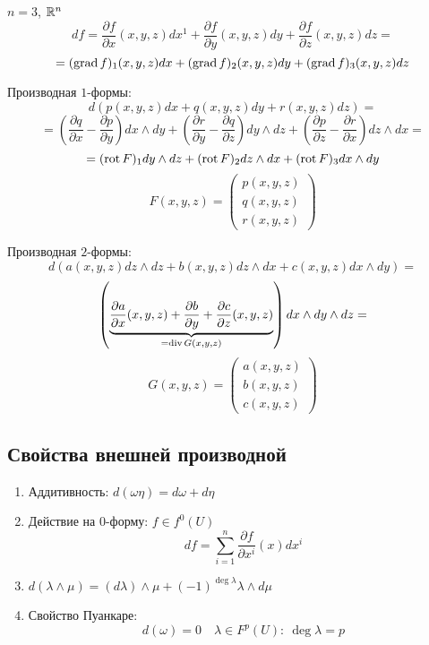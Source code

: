     \begin{illustration*}
        $n = 3$, $\mathbb{R}^n$
        \[
            df = \frac{\partial f}{\partial x}(x, y, z) dx^1 + \frac{\partial f}{\partial y}(x, y, z)dy + \frac{\partial f}{\partial z}(x, y, z)dz =    
        \]
        \[ 
            = (\operatorname{grad} f)_1(x, y, z)dx + (\operatorname{grad} f)_2(x, y, z)dy + (\operatorname{grad} f)_3(x, y, z) dz
        \]
        \par Производная $1$-формы:
        \[
            d(p(x, y, z)dx + q(x, y, z) dy + r(x, y, z) dz) = 
        \]
        \[
            = (\frac{\partial q}{\partial x} - \frac{\partial p}{\partial y})dx \wedge dy + (\frac{\partial r}{\partial y} - \frac{\partial q}{\partial z})dy\wedge dz + (\frac{\partial p}{\partial z} - \frac{\partial r}{\partial x})dz \wedge dx =  
        \]
        \[
            = (\operatorname{rot} F)_1 dy \wedge dz + (\operatorname{rot} F)_2 dz \wedge dx + (\operatorname{rot} F)_3 dx \wedge dy
        \]
        \[
            F(x, y, z) = \begin{pmatrix}
                p(x, y, z) \\
                q(x, y, z) \\
                r(x, y, z)
            \end{pmatrix}  
        \]
        \par Производная $2$-формы:
        \[
            d(a(x, y, z) dz \wedge dz + b(x, y, z) dz \wedge dx + c(x, y, z) dx \wedge dy) =    
        \]
        \[
            \left(\underbrace{\frac{\partial a}{\partial x}(x, y, z) + \frac{\partial b}{\partial y} + \frac{\partial c}{\partial z}(x, y, z)}_{= \operatorname{div} G(x, y, z)}\right) dx \wedge dy \wedge dz =
        \]
        \[ %
            G(x, y, z) = \begin{pmatrix}
                a(x, y, z) \\
                b(x, y, z) \\
                c(x, y, z)
            \end{pmatrix}
        \]
    \end{illustration*}

    \subsection*{Свойства внешней производной}

    \begin{enumerate}
        \item Аддитивность: $d(\omega \eta) = d \omega + d \eta$
        \item Действие на $0$-форму: $f \in f^0(U)$
            \[
                df = \sum_{i=1}^n \frac{\partial f}{\partial x^i}(x) dx^i
            \]
        \item $d(\lambda \wedge \mu) = (d\lambda) \wedge \mu + (-1)^{\deg \lambda} \lambda \wedge d \mu$
        \item Свойство Пуанкаре:
            \[
                d(\omega) = 0 \quad \lambda \in F^p(U): \ \deg \lambda = p    
            \]
    \end{enumerate}

